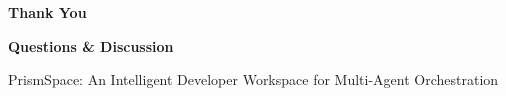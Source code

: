 \documentclass[aspectratio=169,10pt]{beamer}
\begin{document}
\begin{frame}
    \centering
    \vfill
    {\color{prismNavy}\Huge \textbf{Thank You}}
    
    \vspace{0.8cm}
    {\large \textbf{Questions \& Discussion}}
    
    \vspace{0.8cm}
    {\small \color{prismBlue} PrismSpace: An Intelligent Developer Workspace for Multi-Agent Orchestration}
    \vfill
\end{frame}
\end{document}
